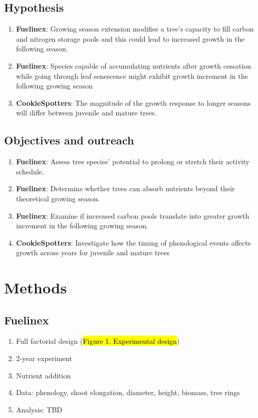 \documentclass{article}
\begin{document}
\subsection *{Hypothesis}
\begin {enumerate}
	\item \textbf{Fuelinex}: Growing season extension modifies a tree’s capacity to fill carbon and nitrogen storage pools and this could lead to increased growth in the following season.
	\item \textbf{Fuelinex}: Species capable of accumulating nutrients after growth cessation while going through leaf senescence might exhibit growth increment in the following growing season
	\item \textbf{CookieSpotters}: The magnitude of the growth response to longer seasons will differ between juvenile and mature trees.
\end {enumerate}

\subsection *{Objectives and outreach}
\begin {enumerate}
	\item \textbf{Fuelinex}: Assess tree species’ potential to prolong or stretch their activity schedule.
	\item \textbf{Fuelinex}:  Determine whether trees can absorb nutrients beyond their theoretical growing season.
	\item \textbf{Fuelinex}:  Examine if increased carbon pools translate into greater growth increment in the following growing season. 
	\item \textbf{CookieSpotters}: Investigate how the timing of phenological events affects growth across years for juvenile and mature trees
\end {enumerate}

\section*{Methods}

\subsection*{Fuelinex}
\begin {enumerate}
	\item Full factorial design (\hl{Figure 1. Experimental design})
	\item 2-year experiment 
	\item Nutrient addition
	\item Data: phenology, shoot elongation, diameter, height, biomass, tree rings
	\item Analysis: TBD
\end {enumerate}
\end{document}
